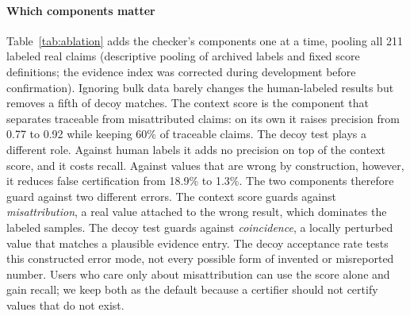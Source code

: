\documentclass[preprint,12pt,authoryear]{elsarticle}
\begin{document}
\paragraph{Which components matter} Table~\ref{tab:ablation} adds the checker's components one at a time, pooling all 211 labeled real claims (descriptive pooling of archived labels and fixed score definitions; the evidence index was corrected during development before confirmation). Ignoring bulk data barely changes the human-labeled results but removes a fifth of decoy matches. The context score is the component that separates traceable from misattributed claims: on its own it raises precision from 0.77 to 0.92 while keeping 60\% of traceable claims. The decoy test plays a different role. Against human labels it adds no precision on top of the context score, and it costs recall. Against values that are wrong by construction, however, it reduces false certification from 18.9\% to 1.3\%. The two components therefore guard against two different errors. The context score guards against \emph{misattribution}, a real value attached to the wrong result, which dominates the labeled samples. The decoy test guards against \emph{coincidence}, a locally perturbed value that matches a plausible evidence entry. The decoy acceptance rate tests this constructed error mode, not every possible form of invented or misreported number. Users who care only about misattribution can use the score alone and gain recall; we keep both as the default because a certifier should not certify values that do not exist.

\begin{table}[t]
\centering
\caption{Component ablation on all 211 labeled real claims (158 traceable), pooling development and confirmation samples. Precision with exact 95\% intervals on unweighted counts; recall unweighted (population-weighted in parentheses). Decoy acceptance over 1,351 eligible development claims with at least two significant digits (from 1,539 extracted claims).}
\label{tab:ablation}
\footnotesize
\setlength{\tabcolsep}{3pt}
\end{table}
\end{document}
